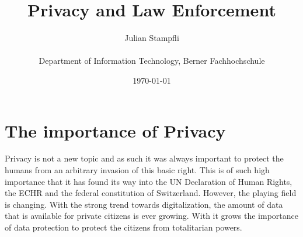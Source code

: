 \documentclass[12pt]{article}
\title{Privacy and Law Enforcement}
\author
{Julian Stampfli\\
\\
\normalsize{Department of Information Technology, Berner Fachhochschule}\\
}
\date{\today}
\begin{document}
 


\baselineskip24pt


\maketitle 




\section*{The importance of Privacy}

Privacy is not a new topic and as such it was always important to protect the humans from an arbitrary invasion of this basic right. This is of such high importance that it has found its way into the UN Declaration of Human Rights, the ECHR and the federal constitution of Switzerland. \cite{humanRights, emrk, bvg} However, the playing field is changing. With the strong trend towards digitalization, the amount of data that is available for private citizens is ever growing. With it grows the importance of data protection to protect the citizens from totalitarian powers. \cite{digDat}
\end{document}
